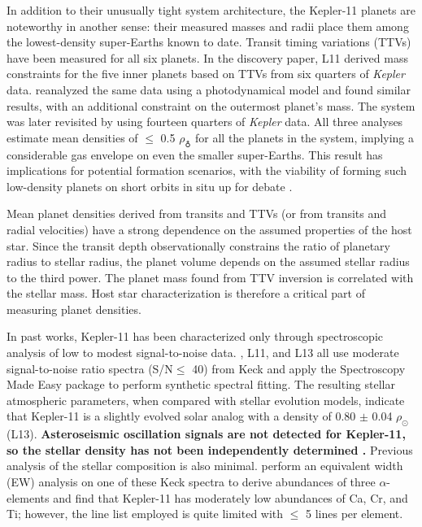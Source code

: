\documentclass[twocolumn]{aastex61}
\newcommand{\Kepler}{\textit{Kepler} }
\begin{document}
In addition to their unusually tight system architecture, the Kepler-11 planets are noteworthy in another sense: their measured masses and radii place them among the lowest-density super-Earths known to date. Transit timing variations (TTVs) have been measured for all six planets. In the discovery paper,  L11 derived mass constraints for the five inner planets based on TTVs from six quarters of \Kepler data. \citet{Migaszewski2012} reanalyzed the same data using a photodynamical model and found similar results, with an additional constraint on the outermost planet's mass. The system was later revisited by \citet[][hereafter L13]{Lissauer2013} using fourteen quarters of \Kepler data. All three analyses estimate mean densities of $\leq$ 0.5 $\rho_{\earth}$ for all the planets in the system, implying a considerable gas envelope on even the smaller super-Earths. This result has implications for potential formation scenarios, with the viability of forming such low-density planets on short orbits in situ up for debate \citep[e.g.][]{Lopez2012, Chiang2013, Bodenheimer2014, Howe2015}.

Mean planet densities derived from transits and TTVs (or from transits and radial velocities) have a strong dependence on the assumed properties of the host star. Since the transit depth observationally constrains the ratio of planetary radius to stellar radius, the planet volume depends on the assumed stellar radius to the third power. The planet mass found from TTV inversion is correlated with the stellar mass. Host star characterization is therefore a critical part of measuring planet densities.

In past works, Kepler-11 has been characterized only through spectroscopic analysis of low to modest signal-to-noise data. \citet{Rowe2014}, L11, and L13 all use moderate signal-to-noise ratio spectra (S/N$\leq$ 40) from Keck and apply the Spectroscopy Made Easy package \citep[SME,][]{Valenti1996} to perform synthetic spectral fitting. The resulting stellar atmospheric parameters, when compared with stellar evolution models, indicate that Kepler-11 is a slightly evolved solar analog with a density of 0.80 $\pm$ 0.04 $\rho_{\odot}$ (L13). \textbf{Asteroseismic oscillation signals are not detected for Kepler-11, so the stellar density has not been independently determined \citep{Campante2014}.} Previous analysis of the stellar composition is also minimal. \citet{Adibekyan2012b} perform an equivalent width (EW) analysis on one of these Keck spectra to derive abundances of three $\alpha$-elements and find that Kepler-11 has moderately low abundances of Ca, Cr, and Ti; however, the line list employed is quite limited with $\leq$ 5 lines per element.
\end{document}
